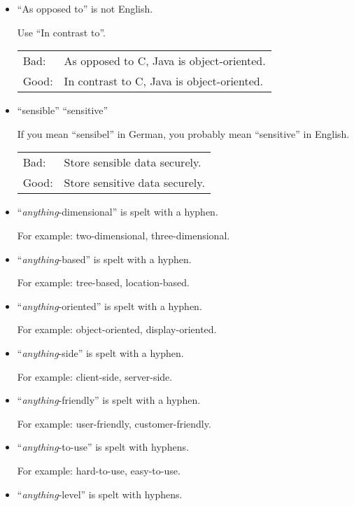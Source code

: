 \begin{itemize}
\item ``As opposed to'' is not English.

Use ``In contrast to''.

\begin{tabular}{lp{0.9\hsize}}
Bad:  & As opposed to C, Java is object-oriented. \\
Good: & In contrast to C, Java is object-oriented. \\
\end{tabular}




\item ``sensible'' \neqsym ``sensitive'' 

If you mean ``sensibel'' in German, you probably mean
``sensitive'' in English.

\begin{tabular}{lp{0.9\hsize}}
Bad:  & Store sensible data securely. \\
Good: & Store sensitive data securely. \\
\end{tabular}




\item ``\emph{anything}-dimensional'' is spelt with a hyphen.

For example: two-dimensional, three-dimensional.


\item ``\emph{anything}-based'' is spelt with a hyphen.

For example: tree-based, location-based.


\item ``\emph{anything}-oriented'' is spelt with a hyphen.

For example: object-oriented, display-oriented.


\item ``\emph{anything}-side'' is spelt with a hyphen.

For example: client-side, server-side.


\item ``\emph{anything}-friendly'' is spelt with a hyphen.

For example: user-friendly, customer-friendly.


\item ``\emph{anything}-to-use'' is spelt with hyphens.

For example: hard-to-use, easy-to-use.


\item ``\emph{anything}-level'' is spelt with hyphens.


\end{itemize}
